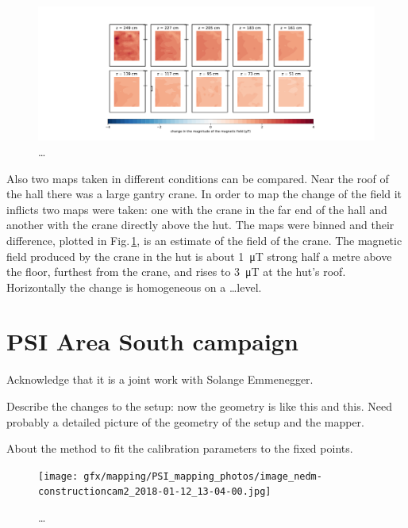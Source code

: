 \begin{figure}
  \centering
  \includegraphics[width=\linewidth]{gfx/mapping/lpsc/bastille_crane_change_magnitude_crop.pdf}
  \caption{\ldots}\label{fig:mapping_bastille_crane_change}
\end{figure}

Also two maps taken in different conditions can be compared. Near the roof of the hall there was a large gantry crane. In order to map the change of the field it inflicts two maps were taken: one with the crane in the far end of the hall and another with the crane directly above the hut. The maps were binned and their difference, plotted in Fig.\,\ref{fig:mapping_bastille_crane_change}, is an estimate of the field of the crane. The magnetic field produced by the crane in the hut is about \SI{1}{\micro\tesla} strong half a metre above the floor, furthest from the crane, and rises to \SI{3}{\micro\tesla} at the hut's roof. Horizontally the change is homogeneous on a \ldots level.






\section{PSI Area South campaign}

Acknowledge that it is a joint work with Solange Emmenegger.

Describe the changes to the setup: now the geometry is like this and this. Need probably a detailed picture of the geometry of the setup and the mapper.

About the method to fit the calibration parameters to the fixed points.

\begin{figure}
  \centering
  \texttt{[image: gfx/mapping/PSI\_mapping\_photos/image\_nedm-constructioncam2\_2018-01-12\_13-04-00.jpg]}
  \caption{\ldots}\label{fig:mapping_photo}
\end{figure}